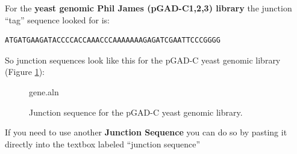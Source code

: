 \documentclass[11pt,fleqn]{book} %
\begin{document}
\vspace{15pt}

For the \textbf{yeast genomic Phil James (pGAD-C1,2,3) library} the junction ``tag'' sequence looked for is:
\begin{lstlisting}
ATGATGAAGATACCCCACCAAACCCAAAAAAAGAGATCGAATTCCCGGGG
\end{lstlisting}

So junction sequences look like this for the pGAD-C yeast genomic library (Figure \ref{fig:gene-junction}):

\begin{figure}[!ht]
\centering
\begin{texshade}{gene.aln}
%	
	\hideconsensus
	\hidenumbering
%	
%	
%	
\end{texshade}
\caption{Junction sequence for the pGAD-C yeast genomic library.}
\label{fig:gene-junction}
\end{figure}


If you need to use another \textbf{Junction Sequence} you can do so by pasting it directly into the textbox labeled ``junction sequence''
\end{document}
